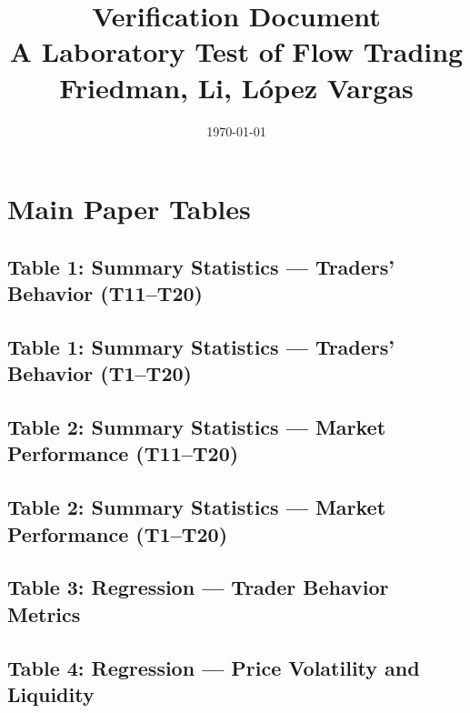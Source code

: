 \documentclass[11pt]{article}
\title{Verification Document\\
\large A Laboratory Test of Flow Trading\\
Friedman, Li, L\'{o}pez Vargas}
\date{\today}
\begin{document}
\maketitle
\tableofcontents
\clearpage

\section{Main Paper Tables}

\subsection{Table 1: Summary Statistics --- Traders' Behavior (T11--T20)}

\clearpage

\subsection{Table 1: Summary Statistics --- Traders' Behavior (T1--T20)}

\clearpage

\subsection{Table 2: Summary Statistics --- Market Performance (T11--T20)}

\clearpage

\subsection{Table 2: Summary Statistics --- Market Performance (T1--T20)}

\clearpage

\subsection{Table 3: Regression --- Trader Behavior Metrics}

\clearpage

\subsection{Table 4: Regression --- Price Volatility and Liquidity}

\clearpage
\end{document}
